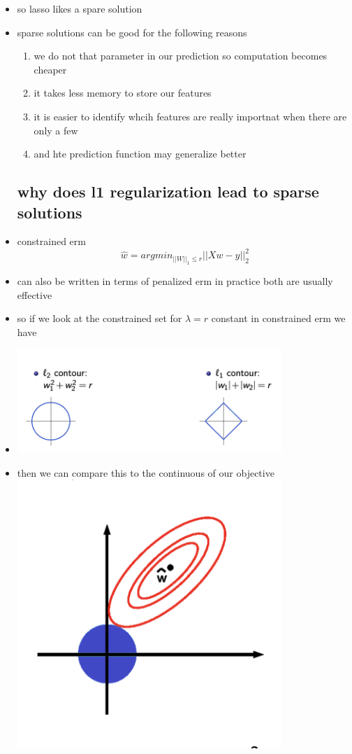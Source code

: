 \documentclass{article}
\begin{document}
\begin{itemize}
\item so lasso likes a spare solution 
\item sparse solutions can be good for the following reasons 
\begin{enumerate}
    \item we do not that parameter in our prediction so computation becomes cheaper
    \item it takes less memory to store our features 
    \item it is easier to identify whcih features are really importnat when there are only  a few 
    \item and hte prediction function may generalize better
\end{enumerate}
\subsection*{why does l1 regularization lead to sparse solutions}
\item constrained erm $$\hat{w}=argmin_{||W||_1\leq r}||Xw-y||^2_{2}$$
\item can also be written in terms of penalized erm in practice both are usually effective 
\item so if we look at the constrained set for $\lambda=r$ constant in constrained erm we have 
\item \includegraphics*[width=10cm]{images/Screenshot 2023-05-10 at 10.13.39 PM.png}
\item then we can compare this to the continuous of our objective\\ \includegraphics*[width=10cm]{images/Screenshot 2023-05-10 at 10.15.28 PM.png}

\end{itemize}
\end{document}
